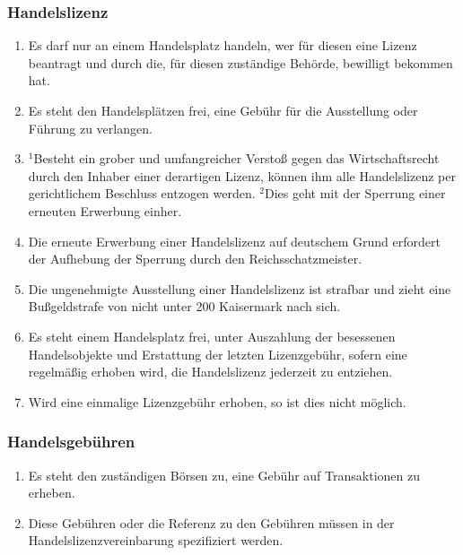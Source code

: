 \documentclass{article}
\begin{document}
\subsubsection{Handelslizenz}
\begin{enumerate}[(1)]
    \item Es darf nur an einem Handelsplatz handeln, wer für diesen eine Lizenz beantragt und durch die, für diesen zuständige Behörde, bewilligt bekommen hat.
    \item Es steht den Handelsplätzen frei, eine Gebühr für die Ausstellung oder Führung zu verlangen.
    \item ${^1}$Besteht ein grober und umfangreicher Verstoß gegen das Wirtschaftsrecht durch den Inhaber einer derartigen Lizenz, können ihm alle Handelslizenz per gerichtlichem Beschluss entzogen werden. ${^2}$Dies geht mit der Sperrung einer erneuten Erwerbung einher.
    \item Die erneute Erwerbung einer Handelslizenz auf deutschem Grund erfordert der Aufhebung der Sperrung durch den Reichsschatzmeister.
    \item Die ungenehmigte Ausstellung einer Handelslizenz ist strafbar und zieht eine Bußgeldstrafe von nicht unter 200 Kaisermark nach sich.
    \item Es steht einem Handelsplatz frei, unter Auszahlung der besessenen Handelsobjekte und Erstattung der letzten Lizenzgebühr, sofern eine regelmäßig erhoben wird, die Handelslizenz jederzeit zu entziehen.
    \item Wird eine einmalige Lizenzgebühr erhoben, so ist dies nicht möglich.
\end{enumerate}

\subsubsection{Handelsgebühren}
\begin{enumerate}[(1)]
    \item Es steht den zuständigen Börsen zu, eine Gebühr auf Transaktionen zu erheben.
    \item Diese Gebühren oder die Referenz zu den Gebühren müssen in der Handelslizenzvereinbarung spezifiziert werden.
\end{enumerate}
\end{document}
